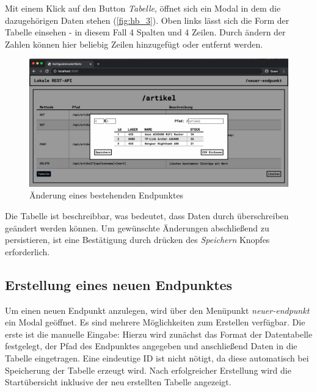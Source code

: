 Mit einem Klick auf den Button \textit{Tabelle}, öffnet sich ein Modal in dem die dazugehörigen Daten stehen (\autoref{fig:hb_3}). Oben links lässt sich die Form der Tabelle einsehen - in diesem Fall 4 Spalten und 4 Zeilen. Durch ändern der Zahlen können hier beliebig Zeilen hinzugefügt oder entfernt werden. 

\begin{figure}[H]
    \centering
    \includegraphics[width=15cm]{figures/hb_3.png}    %
    \caption{Änderung eines bestehenden Endpunktes}
    \label{fig:hb_3}
\end{figure}

Die Tabelle ist beschreibbar, was bedeutet, dass Daten durch überschreiben geändert werden können. Um gewünschte Änderungen abschließend zu persistieren, ist eine Bestätigung durch drücken des \textit{Speichern} Knopfes erforderlich.

\subsection{Erstellung eines neuen Endpunktes}

Um einen neuen Endpunkt anzulegen, wird über den Menüpunkt \textit{neuer-endpunkt} ein Modal geöffnet. Es sind mehrere Möglichkeiten zum Erstellen verfügbar. Die erste ist die manuelle Eingabe: 
Hierzu wird zunächst das Format der Datentabelle festgelegt, der Pfad des Endpunktes angegeben und anschließend Daten in die Tabelle eingetragen. Eine eindeutige ID ist nicht nötigt, da diese automatisch bei Speicherung der Tabelle erzeugt wird. Nach erfolgreicher Erstellung wird die Startübersicht inklusive der neu erstellten Tabelle angezeigt. 

